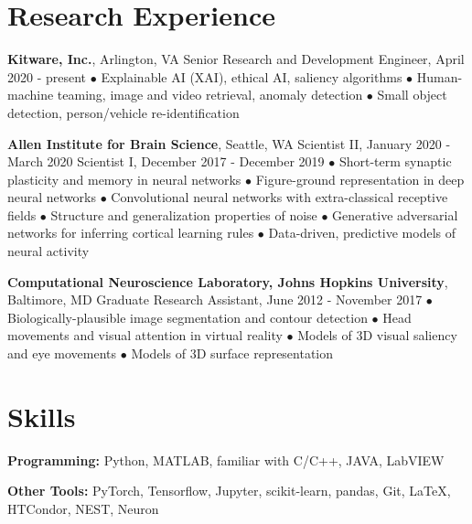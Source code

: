 \documentclass[10pt,letterpaper]{article}
\renewenvironment{itemize}{
  \begin{list}{}{
    \setlength{\leftmargin}{1.5em}
    \setlength{\itemsep}{0.25em}
    \setlength{\parskip}{0pt}
    \setlength{\parsep}{0.25em}
  }
}{
  \end{list}
}
\begin{document}
\section*{Research Experience}
\vspace{-0.05in}
\begin{itemize}
  \item \textbf{Kitware, Inc.}, Arlington, VA
  \subitem Senior Research and Development Engineer, April 2020 - present
  \subitem$\bullet$ Explainable AI (XAI), ethical AI, saliency algorithms
  \subitem$\bullet$ Human-machine teaming, image and video retrieval, anomaly detection
  \subitem$\bullet$ Small object detection, person/vehicle re-identification

  \item \textbf{Allen Institute for Brain Science}, Seattle, WA
  \subitem Scientist II, January 2020 - March 2020
  \subitem Scientist I, December 2017 - December 2019
  \subitem$\bullet$ Short-term synaptic plasticity and memory in neural networks
  \subitem$\bullet$ Figure-ground representation in deep neural networks
  \subitem$\bullet$ Convolutional neural networks with extra-classical receptive fields
  \subitem$\bullet$ Structure and generalization properties of noise
  \subitem$\bullet$ Generative adversarial networks for inferring cortical learning rules
  \subitem$\bullet$ Data-driven, predictive models of neural activity
  
  \item \textbf{Computational Neuroscience Laboratory, Johns Hopkins University}, Baltimore, MD
  \subitem Graduate Research Assistant, June 2012 - November 2017
  \subitem$\bullet$ Biologically-plausible image segmentation and contour detection
  \subitem$\bullet$ Head movements and visual attention in virtual reality
  \subitem$\bullet$ Models of 3D visual saliency and eye movements
  \subitem$\bullet$ Models of 3D surface representation
\end{itemize}

\vspace{-0.25in}

\section*{Skills}
\vspace{-0.05in}
\hspace{1.5em}\textbf{Programming:} Python, MATLAB, familiar with C/C++, JAVA, LabVIEW

\hspace{1.5em}\textbf{Other Tools:} PyTorch, Tensorflow, Jupyter, scikit-learn, pandas, Git, \LaTeX, HTCondor, NEST, Neuron
\end{document}
